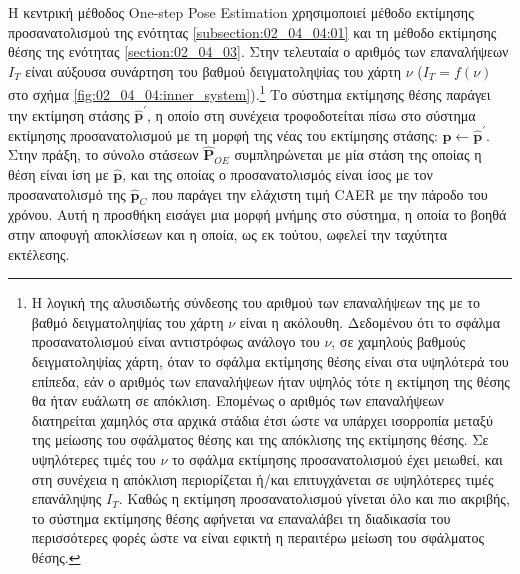 Η κεντρική μέθοδος One-step Pose Estimation χρησιμοποιεί μέθοδο εκτίμησης
προσανατολισμού της ενότητας \ref{subsection:02_04_04:01} και τη μέθοδο
εκτίμησης θέσης της ενότητας \ref{section:02_04_03}.  Στην τελευταία ο αριθμός
των επαναλήψεων $I_T$ είναι αύξουσα συνάρτηση του βαθμού δειγματοληψίας του
χάρτη $\nu$ ($I_T = f(\nu)$ στο σχήμα
\ref{fig:02_04_04:inner_system}).\footnote{Η λογική της αλυσιδωτής σύνδεσης του
αριθμού των επαναλήψεων της με το βαθμό δειγματοληψίας του χάρτη $\nu$ είναι η
ακόλουθη. Δεδομένου ότι το σφάλμα προσανατολισμού είναι αντιστρόφως ανάλογο του
$\nu$, σε χαμηλούς βαθμούς δειγματοληψίας χάρτη, όταν το σφάλμα εκτίμησης θέσης
είναι στα υψηλότερά του επίπεδα, εάν ο αριθμός των επαναλήψεων ήταν υψηλός τότε
η εκτίμηση της θέσης θα ήταν ευάλωτη σε απόκλιση.  Επομένως ο αριθμός των
επαναλήψεων διατηρείται χαμηλός στα αρχικά στάδια έτσι ώστε να υπάρχει
ισορροπία μεταξύ της μείωσης του σφάλματος θέσης και της απόκλισης της
εκτίμησης θέσης. Σε υψηλότερες τιμές του $\nu$ το σφάλμα εκτίμησης
προσανατολισμού έχει μειωθεί, και στη συνέχεια η απόκλιση περιορίζεται ή/και
επιτυγχάνεται σε υψηλότερες τιμές επανάληψης $I_T$. Καθώς η εκτίμηση
προσανατολισμού γίνεται όλο και πιο ακριβής, το σύστημα εκτίμησης θέσης
αφήνεται να επαναλάβει τη διαδικασία του περισσότερες φορές ώστε να είναι
εφικτή η περαιτέρω μείωση του σφάλματος θέσης.} Το σύστημα εκτίμησης θέσης
παράγει την εκτίμηση στάσης $\hat{\bm{p}}^\prime$, η οποίο στη συνέχεια
τροφοδοτείται πίσω στο σύστημα εκτίμησης προσανατολισμού με τη μορφή της νέας
του εκτίμησης στάσης: $\hat{\bm{p}} \leftarrow \hat{\bm{p}}^\prime$. Στην
πράξη, το σύνολο στάσεων $\hat{\bm{P}}_{OE}$ συμπληρώνεται με μία στάση της
οποίας η θέση είναι ίση με $\hat{\bm{p}}$, και της οποίας ο προσανατολισμός
είναι ίσος με τον προσανατολισμό της $\hat{\bm{p}}_C$ που παράγει την ελάχιστη
τιμή CAER με την πάροδο του χρόνου. Αυτή η προσθήκη εισάγει μια μορφή μνήμης
στο σύστημα, η οποία το βοηθά στην αποφυγή αποκλίσεων και η οποία, ως εκ
τούτου, ωφελεί την ταχύτητα εκτέλεσης.



